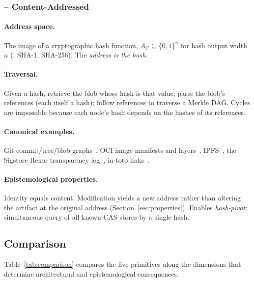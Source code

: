 \subsubsection{ -- Content-Addressed}

\paragraph{Address space.} The image of a cryptographic hash function, $A_{C}
\subseteq \{0,1\}^{n}$ for hash output width $n$ (\eg{}, SHA-1, SHA-256). The
\emph{address is the hash}.
\paragraph{Traversal.} Given a hash, retrieve the blob whose hash is that
value; parse the blob's references (each itself a hash); follow references
to traverse a Merkle DAG. Cycles are impossible because each node's hash
depends on the hashes of its references.
\paragraph{Canonical examples.} Git commit/tree/blob graphs~\cite{chacon2014progit},
OCI image manifests and layers~\cite{ociimagespec}, IPFS~\cite{benet2014ipfs},
the Sigstore Rekor transparency log~\cite{newman2022sigstore},
in-toto links~\cite{torresarias2019intoto}.
\paragraph{Epistemological properties.} Identity equals content. Modification
yields a new address rather than altering the artifact at the original
address (Section~\ref{sec:properties}). Enables \emph{hash-pivot}:
simultaneous query of all known CAS stores by a single hash.

\subsection{Comparison}

Table~\ref{tab:comparison} compares the five primitives along the dimensions
that determine architectural and epistemological consequences.

